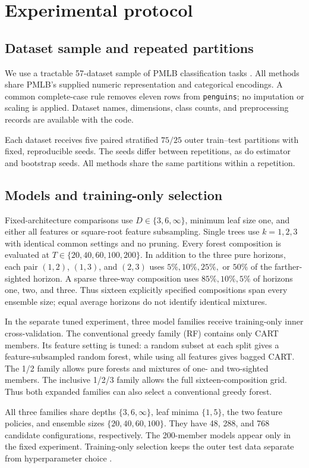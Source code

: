 \documentclass[final,5p,times]{elsarticle}
\begin{document}
\section{Experimental protocol}
\subsection{Dataset sample and repeated partitions}
We use a tractable 57-dataset sample of PMLB classification tasks \cite{olson2017pmlb}. All methods share PMLB's supplied numeric representation and categorical encodings. A common complete-case rule removes eleven rows from \texttt{penguins}; no imputation or scaling is applied. Dataset names, dimensions, class counts, and preprocessing records are available with the code.

Each dataset receives five paired stratified $75/25$ outer train--test partitions with fixed, reproducible seeds. The seeds differ between repetitions, as do estimator and bootstrap seeds. All methods share the same partitions within a repetition.

\subsection{Models and training-only selection}
Fixed-architecture comparisons use $D\in\{3,6,\infty\}$, minimum leaf size one, and either all features or square-root feature subsampling. Single trees use $k=1,2,3$ with identical common settings and no pruning. Every forest composition is evaluated at $T\in\{20,40,60,100,200\}$. In addition to the three pure horizons, each pair $(1,2)$, $(1,3)$, and $(2,3)$ uses $5\%,10\%,25\%,$ or $50\%$ of the farther-sighted horizon. A sparse three-way composition uses $85\%,10\%,5\%$ of horizons one, two, and three. Thus sixteen explicitly specified compositions span every ensemble size; equal average horizons do not identify identical mixtures.

In the separate tuned experiment, three model families receive training-only inner cross-validation. The conventional greedy family (RF) contains only CART members. Its feature setting is tuned: a random subset at each split gives a feature-subsampled random forest, while using all features gives bagged CART. The 1/2 family allows pure forests and mixtures of one- and two-sighted members. The inclusive 1/2/3 family allows the full sixteen-composition grid. Thus both expanded families can also select a conventional greedy forest.

All three families share depths $\{3,6,\infty\}$, leaf minima $\{1,5\}$, the two feature policies, and ensemble sizes $\{20,40,60,100\}$. They have 48, 288, and 768 candidate configurations, respectively. The 200-member models appear only in the fixed experiment. Training-only selection keeps the outer test data separate from hyperparameter choice \cite{cawley2010selection}.
\end{document}
